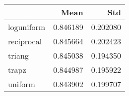 \begin{tabular}{lrr}
\toprule
{} &      Mean &       Std \\
\midrule
loguniform &  0.846189 &  0.202080 \\
reciprocal &  0.845664 &  0.202423 \\
triang     &  0.845038 &  0.194350 \\
trapz      &  0.844987 &  0.195922 \\
uniform    &  0.843902 &  0.199707 \\
\bottomrule
\end{tabular}
